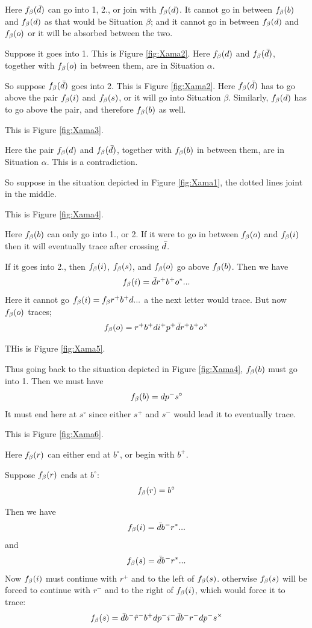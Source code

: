 Here $f_\beta(\bar{d})$ can go into 1, 2., or join with $f_\beta(d)$. It cannot go in between $f_\beta(b)$ and $f_\beta(d)$ as that would be Situation $\beta$; and it cannot go in between $f_\beta(d)$ and $f_\beta(o)$ or it will be absorbed between the two.

Suppose it goes into 1. This is Figure \ref{fig:Xama2}. Here $f_\beta(d)$ and $f_\beta(\bar{d})$, together with $f_\beta(o)$ in between them, are in Situation $\alpha$.

So suppose $f_\beta(\bar{d})$ goes into 2. This is Figure \ref{fig:Xama2}. Here $f_\beta(\bar{d})$ has to go above the pair $f_\beta(i)$ and $f_\beta(s)$, or it will go into Situation $\beta$. Similarly, $f_\beta(d)$ has to go above the pair, and therefore $f_\beta(b)$ as well. 

This is Figure \ref{fig:Xama3}.

Here the pair $f_\beta(d)$ and $f_\beta(\bar{d})$, together with $f_\beta(b)$ in between them, are in Situation $\alpha$. This is a contradiction.

So suppose in the situation depicted in Figure \ref{fig:Xama1}, the dotted lines joint in the middle.

This is Figure \ref{fig:Xama4}.

Here $f_\beta(b)$ can only go into 1., or 2. If it were to go in between $f_\beta(o)$ and $f_\beta(i)$ then it will eventually trace after crossing $\bar{d}$.

If it goes into 2., then $f_\beta(i)$, $f_\beta(s)$, and $f_\beta(o)$ go above $f_\beta(b)$. Then we have
\[
f_\beta(i) = \bar{d} r^+ b^+ o^*...
\]
Here it cannot go $f_\beta(i) = f_\beta r^+ b^+ d...$ a the next letter would trace. But now $f_\beta(o)$ traces;
\[
f_\beta(o) = r^+ b^+ d i^+ p^+ \bar{d} r^+ b^+ o^\times
\]

THis is Figure \ref{fig:Xama5}.

Thus going back to the situation depicted in Figure \ref{fig:Xama4}, $f_\beta(b)$ must go into 1. Then we must have
\[
f_\beta(b) = d p^- s^\circ
\]
It must end here at $s^\circ$ since either $s^+$ and $s^-$ would lead it to eventually trace.

This is Figure \ref{fig:Xama6}.

Here $f_\beta(r)$ can either end at $b^\circ$, or begin with $b^+$.

\label{Zaxes}
Suppose $f_\beta(r)$ ends at $b^\circ$:
\[
f_\beta(r) = b^\circ
\]

Then we have 
\[
f_\beta(i) = \bar{d} b^- r^*...
\]
and
\[
f_\beta(s) = \bar{d} b^- r^*...
\]
Now $f_\beta(i)$ must continue with $r^+$ and to the left of $f_\beta(s)$. otherwise $f_\beta(s)$ will be forced to continue with $r^-$ and to the right of $f_\beta(i)$, which would force it to trace:
\[
f_\beta(s) = \bar{d} b^- \hat{r}^-b^+ d p^- i^- \bar{d} b^- r^- d p^- s^\times
\]

